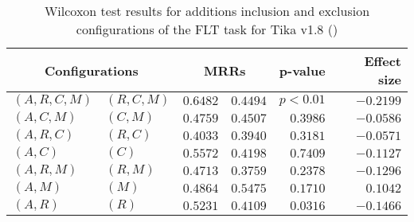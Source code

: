 
\begin{table}
\begin{spacing}{1.2}
\centering
\caption{Wilcoxon test results for additions inclusion and exclusion configurations of the FLT task for Tika v1.8 (\ctwo)}
\label{table:versus-wilcox-tika-flt-additions}
\begin{tabular}{ll|rr|rr}
\toprule
      \multicolumn{2}{c|}{Configurations} &                \multicolumn{2}{c|}{MRRs} &             p-value & Effect size \\
\midrule
 $(A,R,C,M)$ &  $(R,C,M)$ &  $\bm{0.6482}$ &       $0.4494$ & $p<0.01$ &   $-0.2199$ \\
   $(A,C,M)$ &    $(C,M)$ &  $\bm{0.4759}$ &       $0.4507$ & $0.3986$ &   $-0.0586$ \\
   $(A,R,C)$ &    $(R,C)$ &  $\bm{0.4033}$ &       $0.3940$ & $0.3181$ &   $-0.0571$ \\
     $(A,C)$ &      $(C)$ &  $\bm{0.5572}$ &       $0.4198$ & $0.7409$ &   $-0.1127$ \\
   $(A,R,M)$ &    $(R,M)$ &  $\bm{0.4713}$ &       $0.3759$ & $0.2378$ &   $-0.1296$ \\
     $(A,M)$ &      $(M)$ &       $0.4864$ &  $\bm{0.5475}$ & $0.1710$ &    $0.1042$ \\
     $(A,R)$ &      $(R)$ &  $\bm{0.5231}$ &       $0.4109$ & $0.0316$ &   $-0.1466$ \\
\bottomrule
\end{tabular}

\end{spacing}
\end{table}

